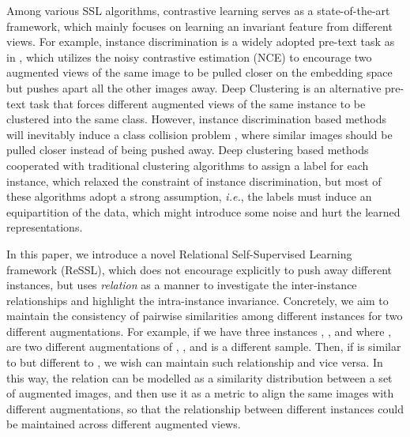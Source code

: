 \documentclass{article}
\newcommand{\<}{\left\langle}
\renewcommand{\>}{\right\rangle}
\newcommand{\ie}{{\emph{i.e.}}}
\begin{document}
Among various SSL algorithms, contrastive learning \cite{instance_discrimination, alignment_uniformity, simclr} serves as a state-of-the-art framework, which mainly focuses on learning an invariant feature from different views. For example, instance discrimination is a widely adopted pre-text task as in \cite{simclr, moco, instance_discrimination},  which utilizes the noisy contrastive estimation (NCE) to encourage two augmented views of the same image to be pulled closer on the embedding space but pushes apart all the other images away. Deep Clustering \cite{deepclustering, Self-labelling, swav} is an alternative pre-text task that forces different augmented views of the same instance to be clustered into the same class. However, instance discrimination based methods will inevitably induce a class collision problem \cite{contrastive_theory, PCL, debiased},  where similar images should be pulled closer instead of being pushed away. Deep clustering based methods cooperated with traditional clustering algorithms to assign a label for each instance, which relaxed the constraint of instance discrimination, but most of these algorithms adopt a strong assumption, \ie, the labels must induce an equipartition of the data, which might introduce some noise and hurt the learned representations.



In this paper, we introduce a novel Relational Self-Supervised Learning framework (ReSSL), which does not encourage explicitly to push away different instances, but uses \textit{relation} as a manner to investigate the inter-instance relationships and highlight the intra-instance invariance. Concretely, we aim to maintain the consistency of pairwise similarities among different instances for two different augmentations. For example, if we have three instances  , ,  and  where ,  are two different augmentations of ,  , and  is a different sample. Then, if  is similar to  but different to , we wish  can maintain such relationship and vice versa. In this way, the relation can be modelled as a similarity distribution between a set of augmented images, and then use it as a metric to align the same images with different augmentations, so that the relationship between different instances could be maintained across different augmented views. 
\end{document}
